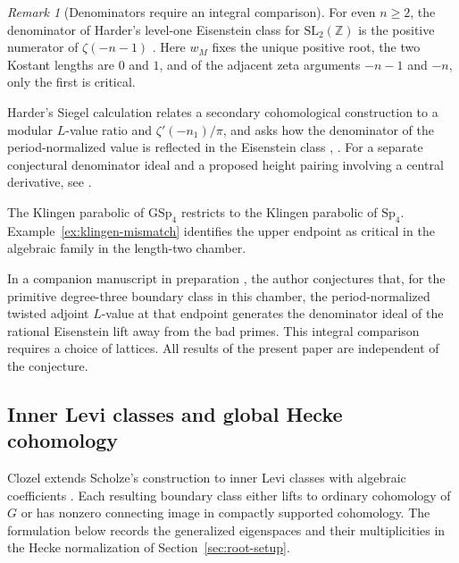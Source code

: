 \documentclass[12pt]{amsart}
\numberwithin{equation}{section}
\theoremstyle{plain}
\theoremstyle{definition}
\theoremstyle{remark}
\newtheorem{remark}[theorem]{Remark}
\newcommand{\Sp}{\mathrm{Sp}}
\newcommand{\GSp}{\mathrm{GSp}}
\newcommand{\Z}{\mathbb{Z}}
\begin{document}
\begin{remark}[Denominators require an integral comparison]\label{rem:denominators}
For even $n\ge2$, the denominator of Harder's level-one Eisenstein class for $\mathrm{SL}_2(\Z)$ is the positive numerator of $\zeta(-n-1)$ \cite[Thm.~2.13]{BekkiSakamoto2025}. Here $w_M$ fixes the unique positive root, the two Kostant lengths are $0$ and $1$, and of the adjacent zeta arguments $-n-1$ and $-n$, only the first is critical.

Harder's Siegel calculation relates a secondary cohomological construction to a modular $L$-value ratio and $\zeta'(-n_1)/\pi$, and asks how the denominator of the period-normalized value is reflected in the Eisenstein class \cite[\S\S2.2.1--2.2.3]{HarderSiegel2013}, \cite[\S9.6.2, pp.~453--455]{HarderChapterNine}. For a separate conjectural denominator ideal and a proposed height pairing involving a central derivative, see \cite[(93), (112)]{HarderDenominators}.

The Klingen parabolic of $\GSp_4$ restricts to the Klingen parabolic of $\Sp_4$. Example~\ref{ex:klingen-mismatch} identifies the upper endpoint as critical in the algebraic family in the length-two chamber. 

In a companion manuscript in preparation \cite{HosseiniJafariKlingen}, the author conjectures that, for the primitive degree-three boundary class in this chamber, the period-normalized twisted adjoint $L$-value at that endpoint generates the denominator ideal of the rational Eisenstein lift away from the bad primes. This integral comparison requires a choice of lattices. All results of the present paper are independent of the conjecture.

\end{remark}

\subsection{Inner Levi classes and global Hecke cohomology} \label{sec:clozel-boundary}
Clozel extends Scholze's construction \cite[\S5.2]{Scholze2015} to inner Levi classes with algebraic coefficients \cite[Thms.~3.4, 3.7 and Prop.~3.5]{Clozel2022}. Each resulting boundary class either lifts to ordinary cohomology of $G$ or has nonzero connecting image in compactly supported cohomology. The formulation below records the generalized eigenspaces and their multiplicities in the Hecke normalization of Section~\ref{sec:root-setup}.
\end{document}
